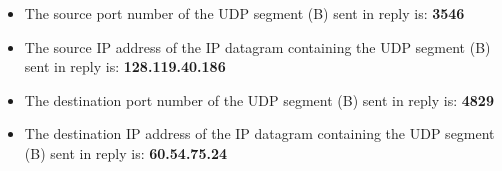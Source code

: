 \begin{itemize}
\begin{figure}[H]
            \label{fig:UDP}
        \end{figure}
        \begin{itemize}
            \item The source port number of the UDP segment (B) sent in reply is: \textbf{3546}
            \item The source IP address of the IP datagram containing the UDP segment (B) sent in reply is: \textbf{128.119.40.186}
            \item The destination port number of the UDP segment (B) sent in reply  is: \textbf{4829}
            \item The destination IP address of the IP datagram containing the UDP segment (B) sent in reply is: \textbf{60.54.75.24}
        \end{itemize}
    \end{itemize}

